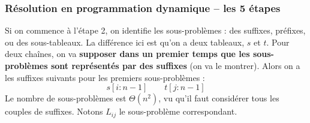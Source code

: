 \documentclass[12pt,a4paper]{book}
\begin{document}
\subsubsection{Résolution en programmation dynamique -- les 5 étapes}
Si on commence à l'étape 2, on identifie les sous-problèmes : des suffixes, préfixes, ou des sous-tableaux. La différence ici est qu'on a deux tableaux, $s$ et $t$. Pour deux chaînes, on va \textbf{supposer dans un premier temps que les sous-problèmes sont représentés par des suffixes} (on va le montrer). Alors on a les suffixes suivants pour les premiers sous-problèmes :
$$s[i:n-1] \qquad t[j:n-1]$$
Le nombre de sous-problèmes est  $\Theta(n^2)$, vu qu'il faut considérer tous les couples de suffixes. Notons $L_{ij}$ le sous-problème correspondant. \\
\end{document}
